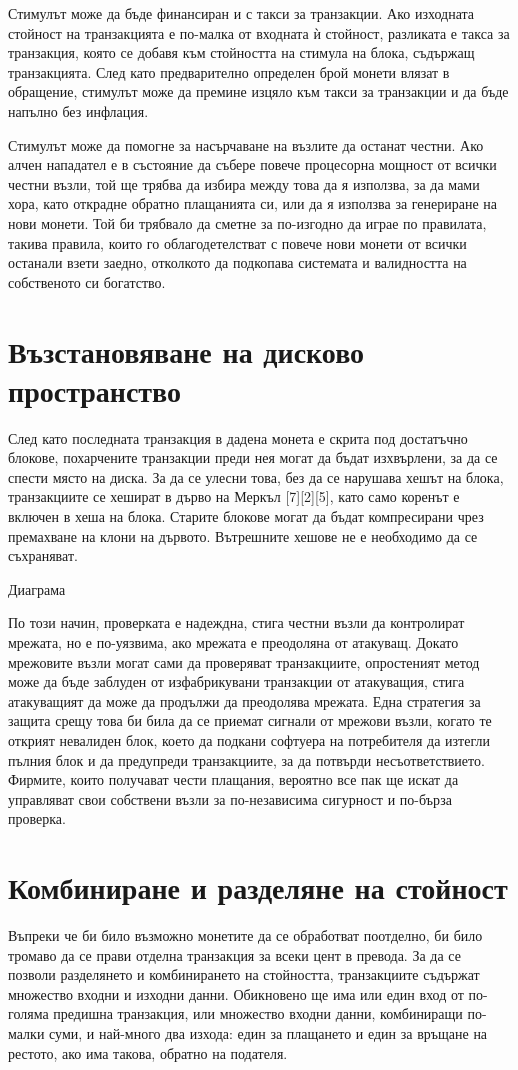 \documentclass[11pt,a4paper]{article}
\begin{document}
Стимулът може да бъде финансиран и с такси за транзакции. Ако изходната стойност на транзакцията е по-малка от входната ѝ стойност, разликата е такса за транзакция, която се добавя към стойността на стимула на блока, съдържащ транзакцията. След като предварително определен брой монети влязат в обращение, стимулът може да премине изцяло към такси за транзакции и да бъде напълно без инфлация.

Стимулът може да помогне за насърчаване на възлите да останат честни. Ако алчен нападател е в състояние да събере повече процесорна мощност от всички честни възли, той ще трябва да избира между това да я използва, за да мами хора, като открадне обратно плащанията си, или да я използва за генериране на нови монети. Той би трябвало да сметне за по-изгодно да играе по правилата, такива правила, които го облагодетелстват с повече нови монети от всички останали взети заедно, отколкото да подкопава системата и валидността на собственото си богатство.

\section{Възстановяване на дисково пространство}
След като последната транзакция в дадена монета е скрита под достатъчно блокове, похарчените транзакции преди нея могат да бъдат изхвърлени, за да се спести място на диска. За да се улесни това, без да се нарушава хешът на блока, транзакциите се хешират в дърво на Меркъл [7][2][5], като само коренът е включен в хеша на блока. Старите блокове могат да бъдат компресирани чрез премахване на клони на дървото. Вътрешните хешове не е необходимо да се съхраняват.

Диаграма

По този начин, проверката е надеждна, стига честни възли да контролират мрежата, но е по-уязвима, ако мрежата е преодоляна от атакуващ. Докато мрежовите възли могат сами да проверяват транзакциите, опростеният метод може да бъде заблуден от изфабрикувани транзакции от атакуващия, стига атакуващият да може да продължи да преодолява мрежата. Една стратегия за защита срещу това би била да се приемат сигнали от мрежови възли, когато те открият невалиден блок, което да подкани софтуера на потребителя да изтегли пълния блок и да предупреди транзакциите, за да потвърди несъответствието. Фирмите, които получават чести плащания, вероятно все пак ще искат да управляват свои собствени възли за по-независима сигурност и по-бърза проверка.

\section{Комбиниране и разделяне на стойност}
Въпреки че би било възможно монетите да се обработват поотделно, би било тромаво да се прави отделна транзакция за всеки цент в превода. За да се позволи разделянето и комбинирането на стойността, транзакциите съдържат множество входни и изходни данни. Обикновено ще има или един вход от по-голяма предишна транзакция, или множество входни данни, комбиниращи по-малки суми, и най-много два изхода: един за плащането и един за връщане на рестото, ако има такова, обратно на подателя.
\end{document}
